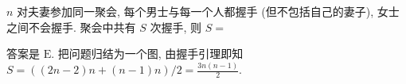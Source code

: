 \begin{prob}
\label{prob:prob-4}
$n$ 对夫妻参加同一聚会, 每个男士与每一个人都握手 (但不包括自己的妻子),
女士之间不会握手. 聚会中共有 $S$ 次握手, 则 $S = $
{}
{}
{}
{}
\end{prob}

\begin{soln}
答案是 $\boxed{\text{E}.}$ 把问题归结为一个图,
由握手引理即知 $S = ((2n - 2)n + (n - 1)n)/2 = \frac{3n(n - 1)}{2}$.
\end{soln}
